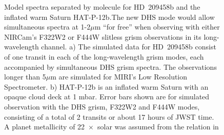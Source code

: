 \documentclass[iop]{emulateapj}
\begin{document}


\begin{figure}[!thb]
\centering
{}
	\caption{Model spectra separated by molecule for HD~209458b and the inflated warm Saturn HAT-P-12b.The new DHS mode would allow simultaneous spectra at 1-2$\mu$m ``for free'' when observing with either NIRCam's F322W2 or F444W slitless grism observations in its long-wavelength channel. a) The simulated data for HD~209458b consist of one transit in each of the long-wavelength grism modes, each accompanied by simultaneous DHS grism spectra. The observations longer than 5$\mu$m are simulated for MIRI's Low Resolution Spectrometer. b) HAT-P-12b is an inflated warm Saturn with an opaque cloud deck at 1 mbar. Error bars shown are for simulated observation with the DHS grism, F322W2 and F444W modes, consisting of a total of 2 transits or about 17 hours of JWST time. A planet metallicity of 22~$\times$~solar was assumed from the relation in \citet{kreidberg2014wasp43}}
	\label{fig:spec}
\end{figure} 
\end{document}
